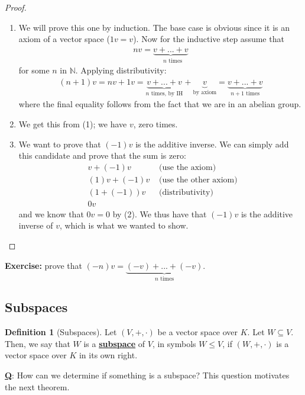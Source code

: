 \documentclass[11pt]{scrartcl}
\theoremstyle{definition}
\newtheorem{definition}{Definition}
\theoremstyle{remark}
\newcommand{\dfn}[1]{\textbf{\underline{#1}}}
\begin{document}
\begin{proof}
	\begin{enumerate}[noitemsep]
		\item We will prove this one by induction. The base case is obvious since it is an axiom of a vector space ($1v = v$). Now for the inductive step assume that 
		\begin{align*}
			nv = \underbrace{v + ... + v}_{\text{ $n$ times}}
		\end{align*}
		for some $n$ in $\mathbb{N}$. Applying distributivity: 
		\begin{align*}
			(n+1) v = nv + 1v = \underbrace{v + ... + v}_{n \text{ times, by IH}} + \underbrace{v}_{\text{by axiom}} = \underbrace{v + ... + v}_{n+1 \text{ times}} 
		\end{align*}
		where the final equality follows from the fact that we are in an abelian group. 
		\item We get this from (1); we have $v$, zero times. 
		\item We want to prove that $(-1)v$ is the additive inverse. We can simply add this candidate and prove that the sum is zero: 
		\begin{align*}
			& v + (-1)v & \text{ (use the axiom) } \\
			& (1)v + (-1)v & \text{ (use the other axiom) } \\
			& (1 + (-1)) v & \text{ (distributivity) } \\
			& 0 v 
		\end{align*}
		and we know that $0v =0$ by (2). We thus have that $(-1)v$ is the additive inverse of $v$, which is what we wanted to show. 
	\end{enumerate}
\end{proof}

\textbf{Exercise:} prove that $(-n)v = \underbrace{(-v) + ... + (-v)}_{n \text{ times}}$. 


\subsection{Subspaces}

\begin{definition}[Subspaces]
	Let $(V, +, \cdot)$ be a vector space over $K$. Let $W \subseteq V$. Then, we say that $W$ is a \dfn{subspace} of $V$, in symbols $W \leq V$, if $(W, +, \cdot)$ is a vector space over $K$ in its own right. 
\end{definition}

\textbf{\underline{Q}}: How can we determine if something is a subspace? This question motivates the next theorem. 
\end{document}
